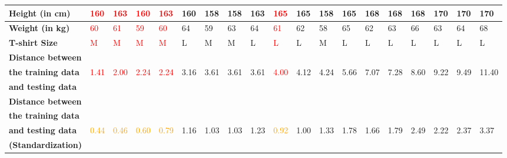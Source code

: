 \documentclass{book}
\begin{document}
\begin{center}
    \begin{tabular}{|m{3cm}|m{0.5cm}|m{0.5cm}|m{0.5cm}|m{0.5cm}|m{0.5cm}|m{0.5cm}|m{0.5cm}|m{0.5cm}|m{0.5cm}|m{0.5cm}|m{0.5cm}|m{0.5cm}|m{0.5cm}|m{0.5cm}|m{0.5cm}|m{0.5cm}|m{0.5cm}|m{0.7cm}|}
        \hline
        \textbf{Height (in cm)} & \textcolor{red}{160} & \textcolor{red}{163} & \textcolor{red}{160} & \textcolor{red}{163} & 160 & 158 & 158 & 163 & \textcolor{red}{165} & 165 & 158 & 165 & 168 & 168 & 168 & 170 & 170 & 170 \\
        \hline
        \textbf{Weight (in kg)} & \textcolor{red}{60} & \textcolor{red}{61} & \textcolor{red}{59} & \textcolor{red}{60} & 64 & 59 & 63 & 64 & \textcolor{red}{61} & 62 & 58 & 65 & 62 & 63 & 66 & 63 & 64 & 68 \\
        \hline
        \textbf{T-shirt Size} & \textcolor{red}{M} & \textcolor{red}{M} & \textcolor{red}{M} & \textcolor{red}{M} & L & M & M & L & \textcolor{red}{L} & L & M & L & L & L & L & L & L & L \\
        \hline
        \textbf{Distance between} & & & & & & & & & & & & & & & & & & \\
        \textbf{the training data} & \textcolor{red}{\scriptsize{1.41}} & \textcolor{red}{\scriptsize{2.00}} & \textcolor{red}{\scriptsize{2.24}} & \textcolor{red}{\scriptsize{2.24}} & \scriptsize{3.16} & \scriptsize{3.61} & \scriptsize{3.61} & \scriptsize{3.61} & \textcolor{red}{\scriptsize{4.00}} & \scriptsize{4.12} & \scriptsize{4.24} & \scriptsize{5.66} & \scriptsize{7.07} & \scriptsize{7.28} & \scriptsize{8.60} & \scriptsize{9.22} & \scriptsize{9.49} & \scriptsize{11.40} \\
        \textbf{and testing data} & & & & & & & & & & & & & & & & & & \\
        \hline
        \textbf{Distance between} & & & & & & & & & & & & & & & & & & \\
        \textbf{the training data} & & & & & & & & & & & & & & & & & & \\
        \textbf{and testing data} & \textcolor{orange}{\scriptsize{0.44}} & \textcolor{orange}{\scriptsize{0.46}} & \textcolor{orange}{\scriptsize{0.60}} & \textcolor{orange}{\scriptsize{0.79}} & \scriptsize{1.16} & \scriptsize{1.03} & \scriptsize{1.03} & \scriptsize{1.23} & \textcolor{orange}{\scriptsize{0.92}} & \scriptsize{1.00} & \scriptsize{1.33} & \scriptsize{1.78} & \scriptsize{1.66} & \scriptsize{1.79} & \scriptsize{2.49} & \scriptsize{2.22} & \scriptsize{2.37} & \scriptsize{3.37} \\
        \textbf{(Standardization)} & & & & & & & & & & & & & & & & & & \\
        \hline
        \end{tabular}
\end{center}
\end{document}
